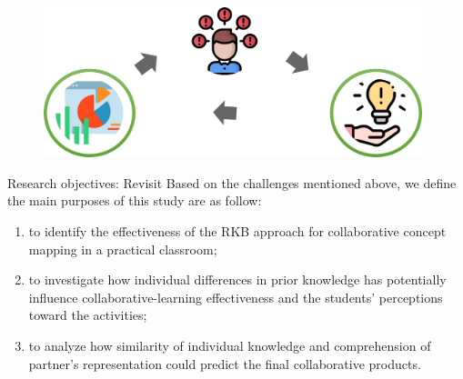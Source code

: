 \begin{frame}{}
    \begin{figure}[tb]
    \begin{center}
        \includegraphics[width=110mm]{images/intro_method_result.png}
    \end{center}
\end{figure}
\end{frame}
\begin{frame}{Research objectives: Revisit}
    Based on the challenges mentioned above, we define the main purposes of this study are as follow: 
    \begin{enumerate}[A]
        \item {\color{blue}to identify the effectiveness of the RKB approach for collaborative concept mapping in a practical classroom};
        \begin{enumerate}
            \item \textcolor{blue}{Collaborative product evaluation
            \item Exploring students' perceptions toward the activity}
        \end{enumerate}
        
        \item to investigate how individual differences in prior knowledge has potentially influence collaborative-learning effectiveness and the students' perceptions toward the activities; 
        
        \item to analyze how similarity of individual knowledge and comprehension  of partner's representation could predict the final collaborative products.
    \end{enumerate} 
\end{frame}

